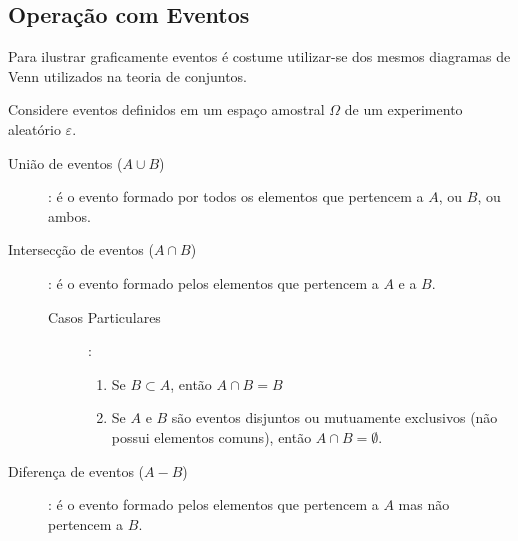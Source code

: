 \subsection{Operação com Eventos}
Para ilustrar graficamente eventos é costume utilizar-se dos mesmos diagramas de Venn utilizados na teoria de conjuntos.

Considere eventos definidos em um espaço amostral $\Omega$ de um experimento aleatório $\varepsilon$.

\begin{description}
  \item [União de eventos ($A \cup B$)]: é o evento formado por todos os elementos que pertencem a $A$, ou  $B$, ou ambos.
    \begin{figure}[H]
      \centering
      
      \caption{}
      \label{fig:1}
    \end{figure} 
  \item [Intersecção de eventos ($A \cap B$)]: é o evento formado pelos elementos que pertencem a $A$ e a $B$.
    \begin{figure}[H]
      \centering
      
      \caption{}
      \label{fig:2}
    \end{figure} 
    \begin{description}
      \item[Casos Particulares]:
        \begin{enumerate}
          \item Se $B \subset A$, então $A \cap B= B$ 

            \begin{figure}[H]
              \centering
              
              \caption{}
              \label{fig:3}
            \end{figure}

          \item Se $A$ e $B$ são eventos disjuntos ou mutuamente exclusivos (não possui elementos comuns), então $A\cap B = \emptyset$.

            \begin{figure}[H]
              \centering
              
              \caption{}
              \label{fig:4}
            \end{figure}

        \end{enumerate}
    \end{description}
  \item[Diferença de eventos ($A-B$)]: é o evento formado pelos elementos que pertencem a $A$ mas não pertencem a $B$.


\end{description}
